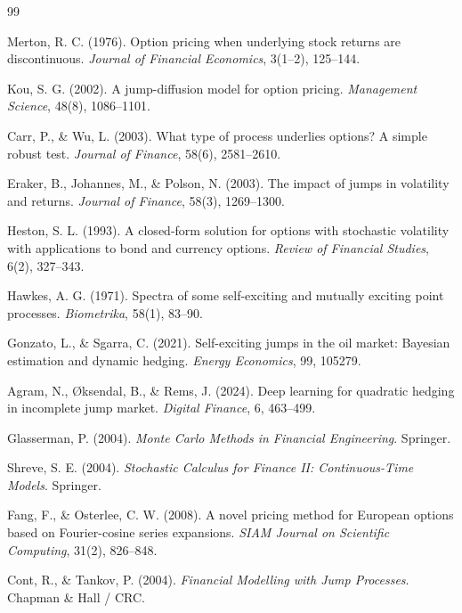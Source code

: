 \documentclass[12pt]{article}
\begin{document}
\begin{thebibliography}{99}

Merton, R. C. (1976).
Option pricing when underlying stock returns are discontinuous.
\textit{Journal of Financial Economics}, 3(1--2), 125--144.

Kou, S. G. (2002).
A jump-diffusion model for option pricing.
\textit{Management Science}, 48(8), 1086--1101.

Carr, P., \& Wu, L. (2003).
What type of process underlies options? A simple robust test.
\textit{Journal of Finance}, 58(6), 2581--2610.

Eraker, B., Johannes, M., \& Polson, N. (2003).
The impact of jumps in volatility and returns.
\textit{Journal of Finance}, 58(3), 1269--1300.

Heston, S. L. (1993).
A closed-form solution for options with stochastic volatility with applications to bond and currency options.
\textit{Review of Financial Studies}, 6(2), 327--343.

Hawkes, A. G. (1971).
Spectra of some self-exciting and mutually exciting point processes.
\textit{Biometrika}, 58(1), 83--90.

Gonzato, L., \& Sgarra, C. (2021).
Self-exciting jumps in the oil market: Bayesian estimation and dynamic hedging.
\textit{Energy Economics}, 99, 105279.

Agram, N., {\O}ksendal, B., \& Rems, J. (2024).
Deep learning for quadratic hedging in incomplete jump market.
\textit{Digital Finance}, 6, 463--499.

Glasserman, P. (2004).
\textit{Monte Carlo Methods in Financial Engineering}.
Springer.

Shreve, S. E. (2004).
\textit{Stochastic Calculus for Finance II: Continuous-Time Models}.
Springer.

Fang, F., \& Osterlee, C. W. (2008).
A novel pricing method for European options based on Fourier-cosine series expansions.
\textit{SIAM Journal on Scientific Computing}, 31(2), 826--848.

Cont, R., \& Tankov, P. (2004).
\textit{Financial Modelling with Jump Processes}.
Chapman \& Hall / CRC.


\end{thebibliography}
\end{document}
